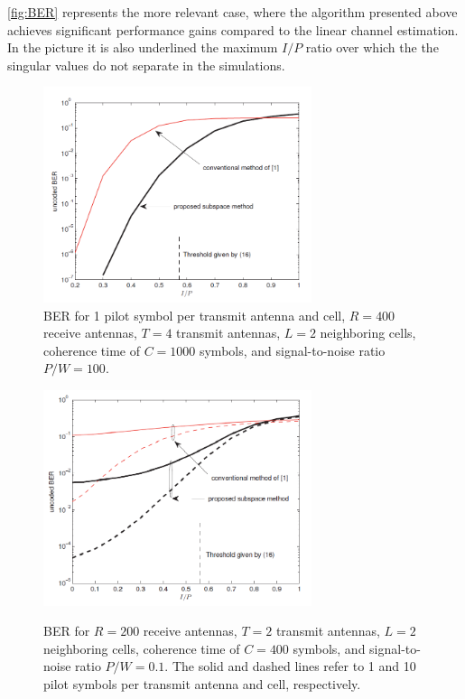 \documentclass[11pt]{book}
\begin{document}
\autoref{fig:BER} represents the more relevant case, where the algorithm presented above achieves significant performance gains compared to the linear channel estimation. In the picture it is also underlined the maximum $I/P$ ratio over which the the singular values do not separate in the simulations.

\begin{figure}
  \centering
  \includegraphics[width = 0.7\textwidth]{SNRvsMarzetta.png}
  \caption{\footnotesize{BER for 1 pilot symbol per transmit antenna and cell, $R = 400$
  receive antennas, $T = 4$ transmit antennas, $L = 2$ neighboring cells, coherence time  of $C = 1000$ symbols, and signal-to-noise ratio $P/W = 100$.}}
  \label{fig:SNR}
\end{figure}
\begin{figure}
  \centering
  \includegraphics[width = 0.7\textwidth]{BERvsMarzetta.png}
  \label{fig:BER}
  \caption{\footnotesize{BER for $R = 200$ receive antennas, $T = 2$ transmit antennas, $L = 2$ neighboring cells, coherence time of $C = 400$ symbols, and signal-to-noise ratio $P/W = 0.1$. The solid and dashed lines refer to 1 and 10 pilot symbols per transmit antenna and cell, respectively.}}
\end{figure}
\end{document}
